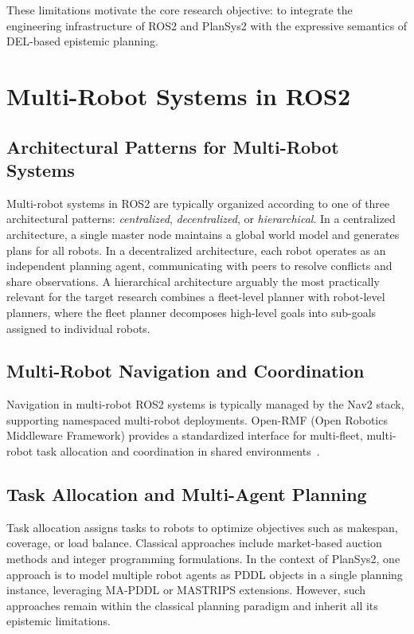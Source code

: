 \documentclass[12pt,a4paper]{article}
\theoremstyle{definition}
\theoremstyle{plain}
\begin{document}
These limitations motivate the core research objective: to integrate the engineering infrastructure
of ROS2 and PlanSys2 with the expressive semantics of DEL-based epistemic planning.


\newpage
\section{Multi-Robot Systems in ROS2}
\label{sec:multirobot}


\subsection{Architectural Patterns for Multi-Robot Systems}

Multi-robot systems in ROS2 are typically organized according to one of three architectural
patterns: \textit{centralized}, \textit{decentralized}, or \textit{hierarchical}. In a centralized
architecture, a single master node maintains a global world model and generates plans for all
robots. In a decentralized architecture, each robot operates as an independent planning agent,
communicating with peers to resolve conflicts and share observations. A hierarchical
architecture arguably the most practically relevant for the target research combines a
fleet-level planner with robot-level planners, where the fleet planner decomposes high-level goals
into sub-goals assigned to individual robots.

\subsection{Multi-Robot Navigation and Coordination}

Navigation in multi-robot ROS2 systems is typically managed by the Nav2 stack, supporting
namespaced multi-robot deployments. Open-RMF (Open Robotics Middleware Framework) provides a
standardized interface for multi-fleet, multi-robot task allocation and coordination in shared
environments~\cite{openrmf2021}.

\subsection{Task Allocation and Multi-Agent Planning}

Task allocation assigns tasks to robots to optimize objectives such as makespan, coverage, or load
balance. Classical approaches include market-based auction methods and integer programming
formulations. In the context of PlanSys2, one approach is to model multiple robot agents as PDDL
objects in a single planning instance, leveraging MA-PDDL or MASTRIPS extensions. However, such
approaches remain within the classical planning paradigm and inherit all its epistemic limitations.
\end{document}
